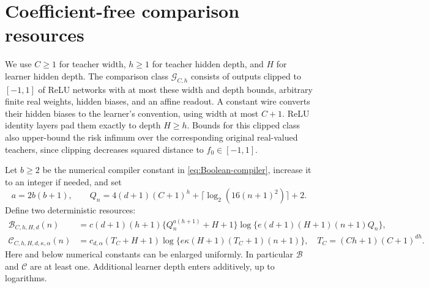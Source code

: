 \section{Coefficient-free comparison resources}
\label{sec:compiler-resources}
We use $C\ge1$ for teacher width, $h\ge1$ for teacher hidden depth, and $H$ for learner hidden depth. The comparison class $\mathcal G_{C,h}$ consists of outputs clipped to $[-1,1]$ of ReLU networks with at most these width and depth bounds, arbitrary finite real weights, hidden biases, and an affine readout. A constant wire converts their hidden biases to the learner's convention, using width at most $C+1$. ReLU identity layers pad them exactly to depth $H\ge h$. Bounds for this clipped class also upper-bound the risk infimum over the corresponding original real-valued teachers, since clipping decreases squared distance to $f_0\in[-1,1]$.

Let $b\ge2$ be the numerical compiler constant in \eqref{eq:Boolean-compiler}, increase it to an integer if needed, and set
\[
 a=2b(b+1),\qquad
 Q_n=4(d+1)(C+1)^h+\lceil\log_2(16(n+1)^2)\rceil+2.
\]
Define two deterministic resources:
\begin{align}
 \mathcal B_{C,h,H,d}(n)
 &=c(d+1)(h+1)\{Q_n^{a(h+1)}+H+1\}
       \log\{e(d+1)(H+1)(n+1)Q_n\},\label{eq:Boolean-resource}\\
 \mathcal C_{C,h,H,d,\kappa,\alpha}(n)
 &=c_{d,\alpha}(T_C+H+1)
       \log\{e\kappa(H+1)(T_C+1)(n+1)\},
 \quad T_C=(Ch+1)(C+1)^{dh}.
 \label{eq:continuous-resource}
\end{align}
Here and below numerical constants can be enlarged uniformly. In particular $\mathcal B$ and $\mathcal C$ are at least one. Additional learner depth enters additively, up to logarithms.

